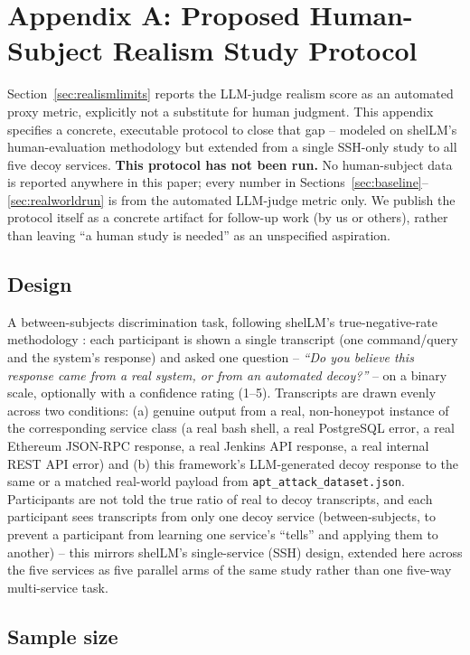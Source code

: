 \documentclass[conference]{IEEEtran}
\begin{document}
\section*{Appendix A: Proposed Human-Subject Realism Study Protocol}
\label{sec:appendixa}

Section~\ref{sec:realismlimits} reports the LLM-judge realism score as an
automated proxy metric, explicitly not a substitute for human judgment.
This appendix specifies a concrete, executable protocol to close that
gap -- modeled on shelLM's human-evaluation methodology
\cite{sladic2024shellm} but extended from a single SSH-only study to all
five decoy services. \textbf{This protocol has not been run.} No
human-subject data is reported anywhere in this paper; every number in
Sections~\ref{sec:baseline}--\ref{sec:realworldrun} is from the
automated LLM-judge metric only. We publish the protocol itself as a
concrete artifact for follow-up work (by us or others), rather than
leaving ``a human study is needed'' as an unspecified aspiration.

\subsection*{Design}

A between-subjects discrimination task, following shelLM's
true-negative-rate methodology \cite{sladic2024shellm}: each participant
is shown a single transcript (one command/query and the system's
response) and asked one question -- \emph{``Do you believe this response
came from a real system, or from an automated decoy?''} -- on a binary
scale, optionally with a confidence rating (1--5). Transcripts are drawn
evenly across two conditions: (a) genuine output from a real,
non-honeypot instance of the corresponding service class (a real bash
shell, a real PostgreSQL error, a real Ethereum JSON-RPC response, a
real Jenkins API response, a real internal REST API error) and (b) this
framework's LLM-generated decoy response to the same or a matched
real-world payload from \texttt{apt\_attack\_dataset.json}. Participants
are not told the true ratio of real to decoy transcripts, and each
participant sees transcripts from only one decoy service
(between-subjects, to prevent a participant from learning one service's
``tells'' and applying them to another) -- this mirrors shelLM's
single-service (SSH) design, extended here across the five services as
five parallel arms of the same study rather than one five-way
multi-service task.

\subsection*{Sample size}
\end{document}
